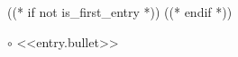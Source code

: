 ((* if not is_first_entry *))
\vspace{<<design.margins.entry_area.vertical_between>>}
((* endif *))

\begin{onecolentry}
    $\circ$ <<entry.bullet>>
\end{onecolentry}
